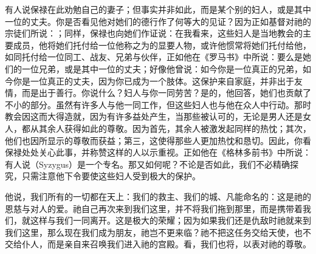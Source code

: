 有人说保禄在此劝勉自己的妻子；但事实并非如此，而是某个别的妇人，或是其中一位的丈夫。你是否看见他对她们的德行作了何等大的见证？因为正如基督对祂的宗徒们所说：；同样，保禄也向她们作证说：在我看来，这些妇人是当地教会的主要成员，他将她们托付给一位他称之为的显要人物，或许他惯常将她们托付给他，如同托付给一位同工、战友、兄弟与伙伴，正如他在《罗马书》中所说：要么是她们的一位兄弟，或是其中一位的丈夫；好像他曾说：如今你是一位真正的兄弟，如今你是一位真正的丈夫，因为你已成为一个肢体。这保护来自家庭，并非出于友情，而是出于善行。你说什么？妇人与你一同劳苦？是的，他回答，她们也贡献了不小的部分。虽然有许多人与他一同工作，但这些妇人也与他在众人中行动。那时教会因这而大得造就，因为有许多益处产生，当那些被认可的，无论是男人还是女人，都从其余人获得如此的尊敬。因为首先，其余人被激发起同样的热忱；其次，他们也因所显示的尊敬而获益；第三，这使得那些人更加热忱和恳切。因此，你看保禄处处关心此事，并称赞这样的人以示重视。正如他在《格林多前书》中所说：有人说（Syzygus）是一个专名。那又如何呢？不论是否如此，我们不必精确探究，只需注意他下令要使这些妇人受到极大的保护。\par

他说，我们所有的一切都在天上：我们的救主、我们的城、凡能命名的：这是祂的恩慈与对人的爱。祂自己再次来到我们这里，并不将我们拖到那里，而是携带着我们，就这样与我们一同离开。这是极大的荣耀；因为如果我们还是仇敌时祂就来到我们这里，那么现在我们成为朋友，祂岂不更来临？祂不把这任务交给天使，也不交给仆人，而是亲自来召唤我们进入祂的宫殿。看，我们也将，以表对祂的尊敬。\par

